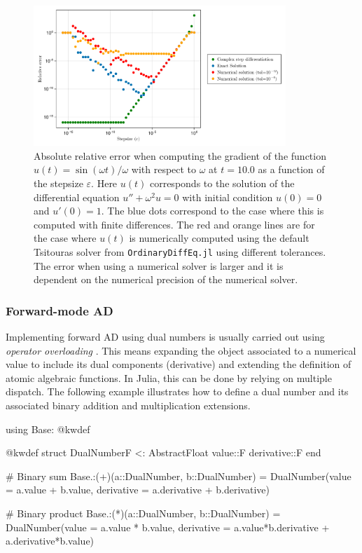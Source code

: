 \begin{figure}[tbh]
    \centering
    \includegraphics[width=0.85\textwidth]{../code/finite_differences/finite_difference_derivative.pdf}
    \caption{Absolute relative error when computing the gradient of the function $u(t) = \sin (\omega t)/\omega$ with respect to $\omega$ at $t=10.0$ as a function of the stepsize $\varepsilon$. Here $u(t)$ corresponds to the solution of the differential equation $u'' + \omega^2 u = 0$ with initial condition $u(0)=0$ and $u'(0)=1$. The blue dots correspond to the case where this is computed with finite differences. The red and orange lines are for the case where $u(t)$ is numerically computed using the default Tsitouras solver \cite{Tsitouras_2011} from \texttt{OrdinaryDiffEq.jl} using different tolerances. The error when using a numerical solver is larger and it is dependent on the numerical precision of the numerical solver. }
    \label{fig:finite-diff}
\end{figure}

\subsubsection{Forward-mode AD}

Implementing forward AD using dual numbers is usually carried out using \textit{operator overloading} \cite{Neuenhofen_2018}. 
This means expanding the object associated to a numerical value to include its dual components (derivative) and extending the definition of atomic algebraic functions. 
In Julia, this can be done by relying on multiple dispatch. 
The following example illustrates how to define a dual number and its associated binary addition and multiplication extensions. 
\begin{jllisting}
using Base: @kwdef

@kwdef struct DualNumber{F <: AbstractFloat}
    value::F
    derivative::F
end

# Binary sum
Base.:(+)(a::DualNumber, b::DualNumber) = DualNumber(value = a.value + b.value, derivative = a.derivative + b.derivative)

# Binary product 
Base.:(*)(a::DualNumber, b::DualNumber) = DualNumber(value = a.value * b.value, derivative = a.value*b.derivative + a.derivative*b.value)
\end{jllisting}

